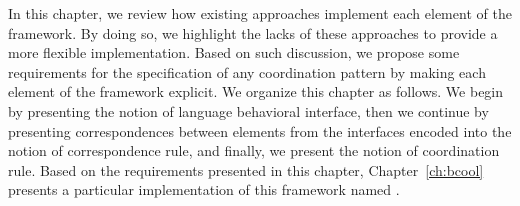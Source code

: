 In this chapter, we review how existing approaches implement each element of the framework. By doing so, we highlight the lacks of these approaches to provide a more flexible implementation. Based on such discussion, we propose some requirements for the specification of any coordination pattern by making each element of the framework explicit. We organize this chapter as follows. We begin by presenting the notion of language behavioral interface, then we continue by presenting correspondences between elements from the interfaces encoded into the notion of correspondence rule, and finally, we present the notion of coordination rule. Based on the requirements presented in this chapter, Chapter~\ref{ch:bcool} presents a particular implementation of this framework named \bcool.

